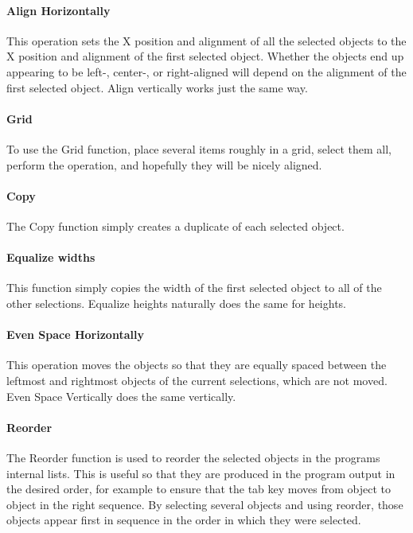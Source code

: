\paragraph{Align Horizontally}
This operation sets the X position and alignment
of all the selected objects to the X position and alignment of
the first selected object. Whether the objects end up appearing to be
left-, center-, or right-aligned will depend on the alignment of the
first selected object. {\textquotedbl}Align vertically{\textquotedbl}
works just the same way.

\paragraph{Grid}
To use the Grid function, place several items roughly in a grid, select
them all, perform the operation, and hopefully they will be nicely
aligned.

\paragraph{Copy}
The Copy function simply creates a duplicate of each selected object.

\paragraph{Equalize widths}
This function simply copies the width of the first
selected object to all of the other selections. {\textquotedbl}Equalize
heights{\textquotedbl} naturally does the same for heights.

\paragraph{Even Space Horizontally}
This operation moves the objects so that they are
equally spaced between the leftmost and rightmost objects of the
current selections, which are not moved. {\textquotedbl}Even Space
Vertically{\textquotedbl} does the same vertically.

\paragraph{Reorder}
The Reorder function is used to reorder the selected objects in the
program{\textquotesingle}s internal lists. This is useful so that they
are produced in the program output in the desired order, for example to
ensure that the tab key moves from object to object in the right
sequence. By selecting several objects and using reorder, those objects
appear first in sequence in the order in which they were selected.

